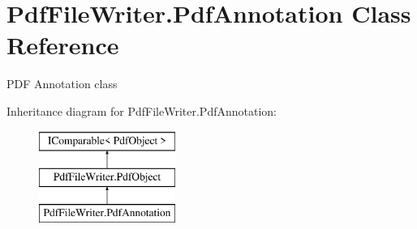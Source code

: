 \hypertarget{class_pdf_file_writer_1_1_pdf_annotation}{}\section{Pdf\+File\+Writer.\+Pdf\+Annotation Class Reference}
\label{class_pdf_file_writer_1_1_pdf_annotation}


P\+DF Annotation class  


Inheritance diagram for Pdf\+File\+Writer.\+Pdf\+Annotation\+:\begin{figure}[H]
\begin{center}
\leavevmode
\includegraphics[height=3.000000cm]{class_pdf_file_writer_1_1_pdf_annotation}
\end{center}
\end{figure}
